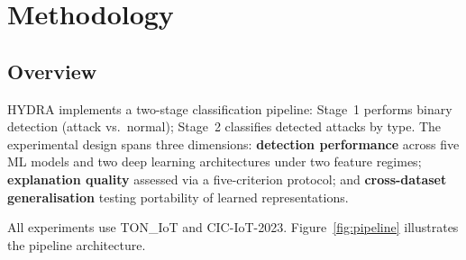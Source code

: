 \documentclass[12pt,a4paper]{report}
\begin{document}
\chapter{Methodology}
\label{ch:methodology}

\section{Overview}
\label{sec:meth-overview}

HYDRA implements a two-stage classification pipeline: Stage~1 performs binary detection (attack vs.\ normal); Stage~2 classifies detected attacks by type. The experimental design spans three dimensions: \textbf{detection performance} across five ML models and two deep learning architectures under two feature regimes; \textbf{explanation quality} assessed via a five-criterion protocol; and \textbf{cross-dataset generalisation} testing portability of learned representations.

All experiments use TON\_IoT and CIC-IoT-2023. Figure~\ref{fig:pipeline} illustrates the pipeline architecture.
\end{document}
